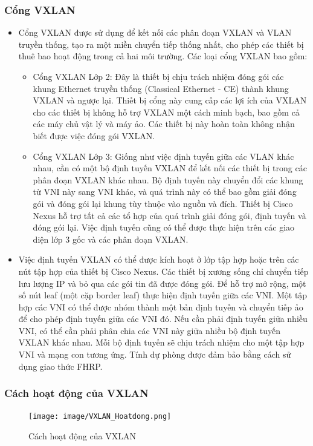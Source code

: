 \documentclass[13pt]{article}
\begin{document}
\subsubsection{Cổng VXLAN}
\begin{itemize}
    \item Cổng VXLAN được sử dụng để kết nối các phân đoạn VXLAN và VLAN truyền thống, tạo ra một miền chuyển tiếp thống nhất, cho phép các thiết bị thuê bao hoạt động trong cả hai môi trường. Các loại cổng VXLAN bao gồm:
    \begin{itemize}
        \item Cổng VXLAN Lớp 2: Đây là thiết bị chịu trách nhiệm đóng gói các khung Ethernet truyền thống (Classical Ethernet - CE) thành khung VXLAN và ngược lại. Thiết bị cổng này cung cấp các lợi ích của VXLAN cho các thiết bị không hỗ trợ VXLAN một cách minh bạch, bao gồm cả các máy chủ vật lý và máy ảo. Các thiết bị này hoàn toàn không nhận biết được việc đóng gói VXLAN.
        \item Cổng VXLAN Lớp 3: Giống như việc định tuyến giữa các VLAN khác nhau, cần có một bộ định tuyến VXLAN để kết nối các thiết bị trong các phân đoạn VXLAN khác nhau. Bộ định tuyến này chuyển đổi các khung từ VNI này sang VNI khác, và quá trình này có thể bao gồm giải đóng gói và đóng gói lại khung tùy thuộc vào nguồn và đích. Thiết bị Cisco Nexus hỗ trợ tất cả các tổ hợp của quá trình giải đóng gói, định tuyến và đóng gói lại. Việc định tuyến cũng có thể được thực hiện trên các giao diện lớp 3 gốc và các phân đoạn VXLAN.
    \end{itemize}
    
    \item Việc định tuyến VXLAN có thể được kích hoạt ở lớp tập hợp hoặc trên các nút tập hợp của thiết bị Cisco Nexus. Các thiết bị xương sống chỉ chuyển tiếp lưu lượng IP và bỏ qua các gói tin đã được đóng gói. Để hỗ trợ mở rộng, một số nút leaf (một cặp border leaf) thực hiện định tuyến giữa các VNI. Một tập hợp các VNI có thể được nhóm thành một bản định tuyến và chuyển tiếp ảo để cho phép định tuyến giữa các VNI đó. Nếu cần phải định tuyến giữa nhiều VNI, có thể cần phải phân chia các VNI này giữa nhiều bộ định tuyến VXLAN khác nhau. Mỗi bộ định tuyến sẽ chịu trách nhiệm cho một tập hợp VNI và mạng con tương ứng. Tính dự phòng được đảm bảo bằng cách sử dụng giao thức FHRP.
\end{itemize}

\subsubsection{Cách hoạt động của VXLAN}
\begin{figure}[h!]
        \centering
        \texttt{[image: image/VXLAN\_Hoatdong.png]}
            \caption{Cách hoạt động của VXLAN}
            \label{fig:label1}
    \end{figure}
    
\end{document}
